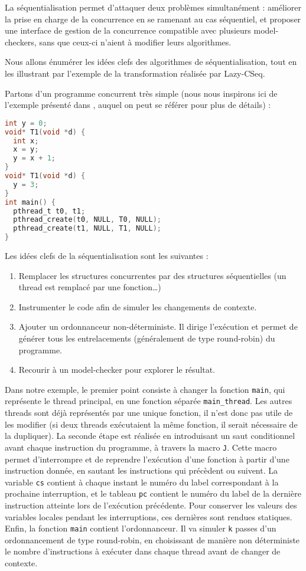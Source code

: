 La séquentialisation permet d'attaquer deux problèmes simultanément : améliorer
la prise en charge de la concurrence en se ramenant au cas séquentiel, et
proposer une interface de gestion de la concurrence compatible avec plusieurs
model-checkers, sans que ceux-ci n'aient à modifier leurs algorithmes.

Nous allons énumérer les idées clefs des algorithmes de séquentialisation, tout
en les illustrant par l'exemple de la transformation réalisée par
Lazy-CSeq\cite{LazyCSeq}.

Partons d'un programme concurrent très simple (nous nous inspirons ici
de l'exemple présenté dans \cite{LazyCSeq}, auquel on peut se
référer pour plus de détails) :

\begin{lstlisting}[language=C]
int y = 0;
void* T1(void *d) {
  int x;
  x = y;
  y = x + 1;
}
void* T1(void *d) {
  y = 3;
}
int main() {
  pthread_t t0, t1;
  pthread_create(t0, NULL, T0, NULL);
  pthread_create(t1, NULL, T1, NULL);
}
\end{lstlisting}

Les idées clefs de la séquentialisation sont les suivantes :

\begin{enumerate}
\def\labelenumi{\arabic{enumi})}
\item
  Remplacer les structures concurrentes par des structures séquentielles
  (un thread est remplacé par une fonction\dots)
\item
  Instrumenter le code afin de simuler les changements de contexte.
\item
  Ajouter un ordonnanceur non-déterministe. Il dirige l'exécution et
  permet de générer tous les entrelacements (généralement de type
  round-robin) du programme.
\item
  Recourir à un model-checker pour explorer le résultat.
\end{enumerate}

Dans notre exemple, le premier point consiste à changer la fonction
\texttt{main}, qui représente le thread principal, en une fonction
séparée \texttt{main\_thread}. Les autres threads sont déjà
représentés par une unique fonction, il n'est donc pas utile de les
modifier (si deux threads exécutaient la même fonction, il serait
nécessaire de la dupliquer). La seconde étape est réalisée en
introduisant un saut conditionnel avant chaque instruction du programme,
à travers la macro \texttt{J}. Cette macro permet d'interrompre et de
reprendre l'exécution d'une fonction à partir d'une instruction donnée,
en sautant les instructions qui précèdent ou suivent. La variable
\texttt{cs} contient à chaque instant le numéro du label
correspondant à la prochaine interruption, et le tableau \texttt{pc}
contient le numéro du label de la dernière instruction atteinte lors de
l'exécution précédente. Pour conserver les valeurs des variables locales
pendant les interruptions, ces dernières sont rendues statiques. Enfin,
la fonction \texttt{main} contient l'ordonnanceur. Il va simuler
\texttt{k} passes d'un ordonnancement de type round-robin, en
choisissant de manière non déterministe le nombre d'instructions à
exécuter dans chaque thread avant de changer de contexte.

